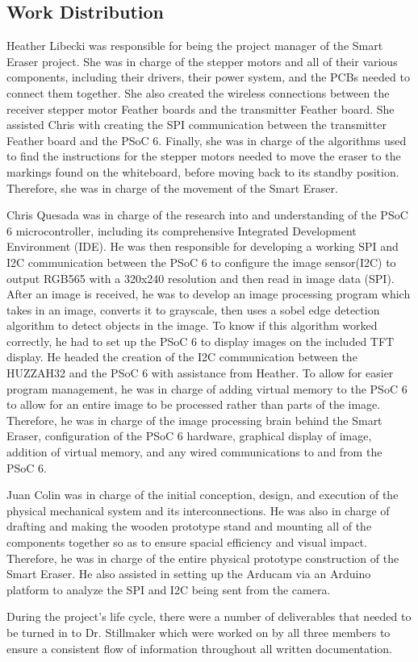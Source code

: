\subsection{Work Distribution}
\setlength{\parindent}{2.5ex} Heather Libecki was responsible for being the project manager of the Smart Eraser project. She was in charge of the stepper motors and all of their various components, including their drivers, their power system, and the PCBs needed to connect them together. She also created the wireless connections between the receiver stepper motor Feather boards and the transmitter Feather board. She assisted Chris with creating the SPI communication between the transmitter Feather board and the PSoC 6. Finally, she was in charge of the algorithms used to find the instructions for the stepper motors needed to move the eraser to the markings found on the whiteboard, before moving back to its standby position. Therefore, she was in charge of the movement of the Smart Eraser. \par
\setlength{\parindent}{2.5ex} Chris Quesada was in charge of the research into and understanding of the PSoC 6 microcontroller, including its comprehensive Integrated Development Environment (IDE). He was then responsible for developing a working SPI and I2C communication between the PSoC 6 to configure the image sensor(I2C) to output RGB565 with a 320x240 resolution and then read in image data (SPI). After an image is received, he was to develop an image processing program which takes in an image, converts it to grayscale, then uses a sobel edge detection algorithm to detect objects in the image. To know if this algorithm worked correctly, he had to set up the PSoC 6 to display images on the included TFT display. He headed the creation of the I2C communication between the HUZZAH32 and the PSoC 6 with assistance from Heather. To allow for easier program management, he was in charge of adding virtual memory to the PSoC 6 to allow for an entire image to be processed rather than parts of the image. Therefore, he was in charge of the image processing brain behind the Smart Eraser, configuration of the PSoC 6 hardware, graphical display of image, addition of virtual memory, and any wired communications to and from the PSoC 6.
 \par
\setlength{\parindent}{2.5ex} Juan Colin was in charge of the initial conception, design, and execution of the physical mechanical system and its interconnections. He was also in charge of drafting and making the wooden prototype stand and mounting all of the components together so as to ensure spacial efficiency and visual impact. Therefore, he was in charge of the entire physical prototype construction of the Smart Eraser. He also assisted in setting up the Arducam via an Arduino platform to analyze the SPI and I2C being sent from the camera.
 \par
\setlength{\parindent}{2.5ex} During the project's life cycle, there were a number of deliverables that needed to be turned in to Dr. Stillmaker which were worked on by all three members to ensure a consistent flow of information throughout all written documentation.

